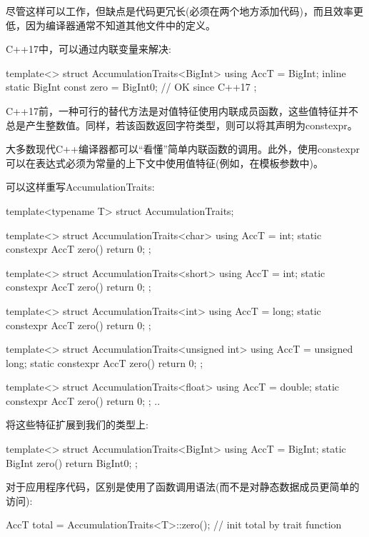 尽管这样可以工作，但缺点是代码更冗长(必须在两个地方添加代码)，而且效率更低，因为编译器通常不知道其他文件中的定义。

C++17中，可以通过内联变量来解决:

\begin{cpp}
template<>
struct AccumulationTraits<BigInt> {
	using AccT = BigInt;
	inline static BigInt const zero = BigInt{0}; // OK since C++17
};
\end{cpp}

C++17前，一种可行的替代方法是对值特征使用内联成员函数，这些值特征并不总是产生整数值。同样，若该函数返回字符类型，则可以将其声明为constexpr。

\begin{notice}
大多数现代C++编译器都可以“看懂”简单内联函数的调用。此外，使用constexpr可以在表达式必须为常量的上下文中使用值特征(例如，在模板参数中)。
\end{notice}

可以这样重写AccumulationTraits:

\begin{cpp}
template<typename T>
struct AccumulationTraits;

template<>
struct AccumulationTraits<char> {
	using AccT = int;
	static constexpr AccT zero() {
		return 0;
	}
};

template<>
struct AccumulationTraits<short> {
	using AccT = int;
	static constexpr AccT zero() {
		return 0;
	}
};

template<>
struct AccumulationTraits<int> {
	using AccT = long;
	static constexpr AccT zero() {
		return 0;
	}
};

template<>
struct AccumulationTraits<unsigned int> {
	using AccT = unsigned long;
	static constexpr AccT zero() {
		return 0;
	}
};

template<>
struct AccumulationTraits<float> {
	using AccT = double;
	static constexpr AccT zero() {
		return 0;
	}
};
..
\end{cpp}

将这些特征扩展到我们的类型上:

\begin{cpp}
template<>
struct AccumulationTraits<BigInt> {
	using AccT = BigInt;
	static BigInt zero() {
		return BigInt{0};
	}
};
\end{cpp}

对于应用程序代码，区别是使用了函数调用语法(而不是对静态数据成员更简单的访问):

\begin{cpp}
AccT total = AccumulationTraits<T>::zero(); // init total by trait function
\end{cpp}

